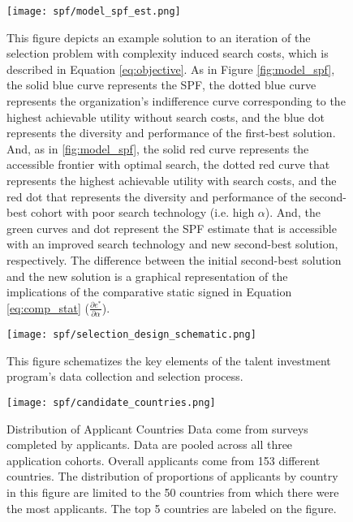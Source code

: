     \newpage
    \begin{figure}[!htb]
    \centering
        \caption{This figure depicts an example solution to an iteration of the selection problem with complexity induced search costs, which is described in Equation \ref{eq:objective}. As in Figure \ref{fig:model_spf}, the solid blue curve represents the SPF, the dotted blue curve represents the organization's indifference curve corresponding to the highest achievable utility without search costs, and the blue dot represents the diversity and performance of the first-best solution. And, as in \ref{fig:model_spf}, the solid red curve represents the accessible frontier with optimal search, the dotted red curve that represents the highest achievable utility with search costs, and the red dot that represents the diversity and performance of the second-best cohort with poor search technology (i.e. high $\alpha$). And, the green curves and dot represent the SPF estimate that is accessible with an improved search technology and new second-best solution, respectively. The difference between the initial second-best solution and the new solution is a graphical representation of the implications of the comparative static signed in Equation \ref{eq:comp_stat} ($\frac{\partial e^*}{\partial \alpha}$).}\label{fig:model_spf_est}
      \texttt{[image: spf/model\_spf\_est.png]}
    \end{figure}
    
    
    \newpage
    \null %
    \vfill
    \begin{center}
    \begin{figure}[!htb]
    \centering
        \caption{This figure schematizes the key elements of the talent investment program's data collection and selection process. }\label{fig:design}
      \texttt{[image: spf/selection\_design\_schematic.png]} 
    \end{figure}
    \end{center}
    \vfill
    
    
    \newpage
    
    \begin{figure}[!htb]
    \centering
        \caption{Distribution of Applicant Countries Data come from surveys completed by applicants. Data are pooled across all three application cohorts. Overall applicants come from 153 different countries. The distribution of proportions of applicants by country in this figure are limited to the 50 countries from which there were the most applicants. The top 5 countries are labeled on the figure.  }\label{fig:country_dist_all}
      \texttt{[image: spf/candidate\_countries.png]} 
    \end{figure}
    
